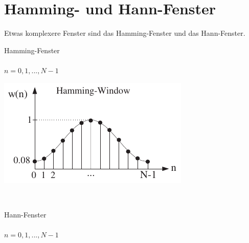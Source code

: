 	\section{Hamming- und Hann-Fenster}
		Etwas komplexere Fenster sind das Hamming-Fenster und das Hann-Fenster.\\[0.2cm]
		\begin{minipage}{0.35\textwidth}
			Hamming-Fenster\\[0.2cm]
			\\[0.25cm]
			$n = 0,1,...,N-1$
		\end{minipage}
		\begin{minipage}{0.25\textwidth}
			\includegraphics[width = \textwidth]{pic/hammingFenster.pdf}
		\end{minipage}\begin{minipage}{0.05\textwidth}$ $\end{minipage}
		\begin{minipage}{0.25\textwidth}
			Hann-Fenster\\[0.2cm]
			\\[0.25cm]
			$n = 0,1,...,N-1$
		\end{minipage}\\
		
